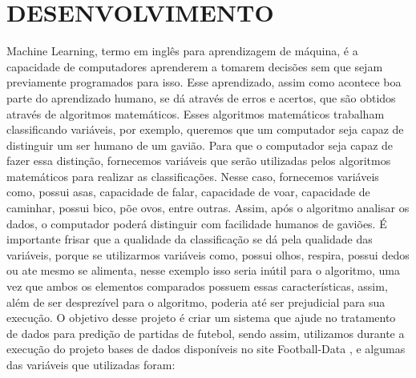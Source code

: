 \section{DESENVOLVIMENTO}
Machine Learning, termo em inglês para aprendizagem de máquina, é a capacidade de computadores aprenderem a tomarem decisões sem que sejam previamente programados para isso. Esse aprendizado, assim como acontece boa parte do aprendizado humano, se dá através de erros e acertos, que são obtidos através de algoritmos matemáticos. Esses algoritmos matemáticos trabalham classificando variáveis, por exemplo, queremos que um computador seja capaz de distinguir um ser humano de um gavião. Para que o computador seja capaz de fazer essa distinção, fornecemos variáveis que serão utilizadas pelos algoritmos matemáticos para realizar as classificações. Nesse caso, fornecemos variáveis como, possui asas, capacidade de falar, capacidade de voar, capacidade de caminhar, possui bico, põe ovos, entre outras. Assim, após o algoritmo analisar os dados, o computador poderá distinguir com facilidade humanos de gaviões. 
É importante frisar que a qualidade da classificação se dá pela qualidade das variáveis, porque se utilizarmos variáveis como, possui olhos, respira, possui dedos ou ate mesmo se alimenta, nesse exemplo isso seria inútil para o algoritmo, uma vez que ambos os elementos comparados possuem essas características, assim, além de ser desprezível para o algoritmo, poderia até ser prejudicial para sua execução. 
O objetivo desse projeto é criar um sistema que ajude no tratamento de dados para predição de partidas de futebol, sendo assim, utilizamos durante a execução do projeto bases de dados disponíveis no site Football-Data \cite{FootballData2019}, e algumas das variáveis que utilizadas foram:
